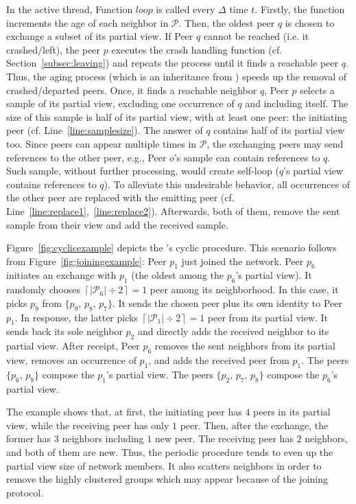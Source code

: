 In the active thread, Function $loop$ is called every $\Delta$ time
$t$. Firstly, the function increments the age of each neighbor in
$\mathcal{P}$. Then, the oldest peer $q$ is chosen to exchange a subset of its
partial view. If Peer $q$ cannot be reached (i.e. it crashed/left), the peer
$p$ executes the crash handling function (cf. Section~\ref{subsec:leaving}) and
repeats the process until it finds a reachable peer $q$. Thus, the aging
process (which is an inheritance from \CYCLON) speeds up the removal of
crashed/departed peers. Once, it finds a reachable neighbor $q$, Peer $p$
selects a sample of its partial view, excluding one occurrence of $q$ and
including itself. The size of this sample is half of its partial view, with at
least one peer: the initiating peer (cf. Line~\ref{line:samplesize}). The
answer of $q$ contains half of its partial view too. Since peers can appear
multiple times in $\mathcal{P}$, the exchanging peers may send references to
the other peer, e.g., Peer $o$'s sample can contain references to $q$. Such
sample, without further processing, would create self-loop ($q$'s partial view
contains references to $q$). To alleviate this undesirable behavior, all
occurrences of the other peer are replaced with the emitting peer
(cf. Line~\ref{line:replace1},~\ref{line:replace2}).  Afterwards, both of them,
remove the sent sample from their view and add the received sample.

Figure~\ref{fig:cyclicexample} depicts the \SPRAY's cyclic
procedure. This scenario follows from Figure~\ref{fig:joiningexample}:
Peer $p_1$ just joined the network. Peer $p_6$ initiates an exchange
with $p_1$ (the oldest among the $p_6$'s partial view). It randomly
chooses $\left\lceil{|\mathcal{P}_6|\div 2}\right\rceil = 1$ peer
among its neighborhood. In this case, it picks $p_9$ from
$\{p_9,\,p_8,\,p_7\}$.  It sends the chosen peer plus its own identity
to Peer $p_1$. In response, the latter picks
$\left\lceil{|\mathcal{P}_1|\div 2}\right\rceil = 1$ peer from its
partial view. It sends back its sole neighbor $p_2$ and directly adds
the received neighbor to its partial view. After receipt, Peer $p_6$
removes the sent neighbors from its partial view, removes an
occurrence of $p_1$, and adds the received peer from $p_1$. The peers
$\{p_6,\,p_9\}$ compose the $p_1$'s partial view. The peers
$\{p_2,\,p_7,\,p_8\}$ compose the $p_6$'s partial view.

The example shows that, at first, the initiating peer has $4$ peers in
its partial view, while the receiving peer has only $1$ peer. Then,
after the exchange, the former has $3$ neighbors including $1$ new
peer. The receiving peer has $2$ neighbors, and both of them are
new. Thus, the periodic procedure tends to even up the partial view
size of network members. It also scatters neighbors in order to remove
the highly clustered groups which may appear because of the joining
protocol.

